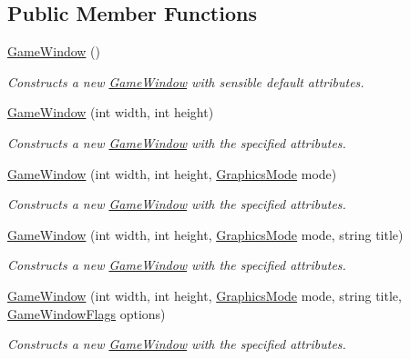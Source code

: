 \subsection*{Public Member Functions}
\begin{DoxyCompactItemize}
\item 
\hyperlink{class_open_t_k_1_1_game_window_a03787ebe6e9bbc2cf29b17d77e757c47}{Game\-Window} ()
\begin{DoxyCompactList}\small\item\em Constructs a new \hyperlink{class_open_t_k_1_1_game_window}{Game\-Window} with sensible default attributes.\end{DoxyCompactList}\item 
\hyperlink{class_open_t_k_1_1_game_window_a6c4be0e7db916803eef71918b388f65c}{Game\-Window} (int width, int height)
\begin{DoxyCompactList}\small\item\em Constructs a new \hyperlink{class_open_t_k_1_1_game_window}{Game\-Window} with the specified attributes.\end{DoxyCompactList}\item 
\hyperlink{class_open_t_k_1_1_game_window_af7e0cb6ae69630e600844b85e1272212}{Game\-Window} (int width, int height, \hyperlink{class_open_t_k_1_1_graphics_1_1_graphics_mode}{Graphics\-Mode} mode)
\begin{DoxyCompactList}\small\item\em Constructs a new \hyperlink{class_open_t_k_1_1_game_window}{Game\-Window} with the specified attributes.\end{DoxyCompactList}\item 
\hyperlink{class_open_t_k_1_1_game_window_a2b0edf27b00276920abcc97b7b05218b}{Game\-Window} (int width, int height, \hyperlink{class_open_t_k_1_1_graphics_1_1_graphics_mode}{Graphics\-Mode} mode, string title)
\begin{DoxyCompactList}\small\item\em Constructs a new \hyperlink{class_open_t_k_1_1_game_window}{Game\-Window} with the specified attributes.\end{DoxyCompactList}\item 
\hyperlink{class_open_t_k_1_1_game_window_a7de515a0cdf71925d6d12b5803e9c513}{Game\-Window} (int width, int height, \hyperlink{class_open_t_k_1_1_graphics_1_1_graphics_mode}{Graphics\-Mode} mode, string title, \hyperlink{namespace_open_t_k_af73dc15fc9d5b87827c81fa11b3ec6f0}{Game\-Window\-Flags} options)
\begin{DoxyCompactList}\small\item\em Constructs a new \hyperlink{class_open_t_k_1_1_game_window}{Game\-Window} with the specified attributes.\end{DoxyCompactList}\item 

\end{DoxyCompactItemize}
